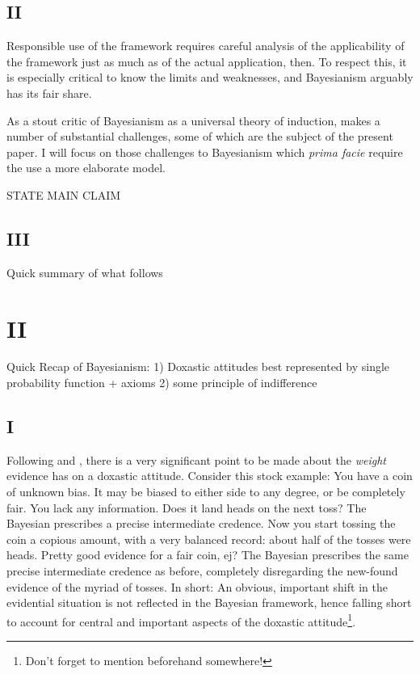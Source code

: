 \documentclass[11pt, a4paper]{scrartcl}
\begin{document}
\subsection{II}
Responsible use of the framework requires careful analysis of the applicability of the framework just as much as of the actual application, then. To respect this, it is especially critical to know the limits and weaknesses, and Bayesianism arguably has its fair share.  

As a stout critic of Bayesianism as a universal theory of induction, \cite{Norton2011-NORCTB} makes a number of substantial challenges, some of which are the subject of the present paper. I will focus on those challenges to Bayesianism which \emph{prima facie} require the use a more elaborate model.

STATE MAIN CLAIM

\subsection{III}
Quick summary of what follows
\section{II}

Quick Recap of Bayesianism: 1) Doxastic attitudes best represented by single probability function + axioms 2) some principle of indifference 

\subsection{I}
Following \cite{Joyce2005-JOYHPR} and \cite{sep-imprecise-probabilities}, there is a very significant point to be made about the \emph{weight} evidence has on a doxastic attitude. Consider this stock example: You have a coin of unknown bias. It may be biased to either side to any degree, or be completely fair. You lack any information. Does it land heads on the next toss? The Bayesian prescribes a precise intermediate credence. Now you start tossing the coin a copious amount, with a very balanced record: about half of the tosses were heads. Pretty good evidence for a fair coin, ej? The Bayesian prescribes the same precise intermediate credence as before, completely disregarding the new-found evidence of the myriad of tosses. In short: An obvious, important shift in the evidential situation is not reflected in the Bayesian framework, hence falling short to account for central and important aspects of the doxastic attitude\footnote{Don't forget to mention beforehand somewhere!}. 
\end{document}
